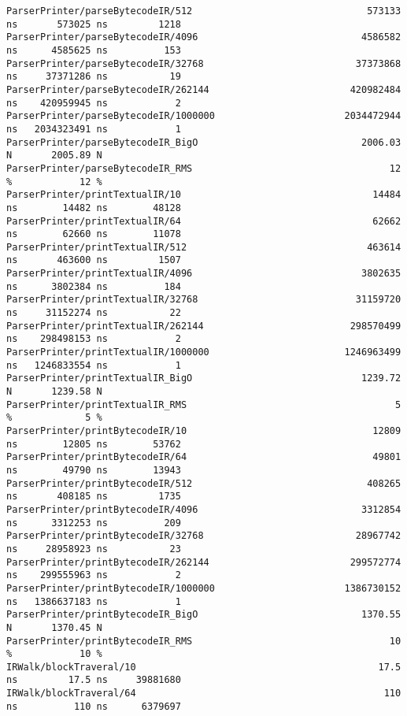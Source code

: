 \begin{code}
\begin{verbatim}
ParserPrinter/parseBytecodeIR/512                               573133 ns       573025 ns         1218
ParserPrinter/parseBytecodeIR/4096                             4586582 ns      4585625 ns          153
ParserPrinter/parseBytecodeIR/32768                           37373868 ns     37371286 ns           19
ParserPrinter/parseBytecodeIR/262144                         420982484 ns    420959945 ns            2
ParserPrinter/parseBytecodeIR/1000000                       2034472944 ns   2034323491 ns            1
ParserPrinter/parseBytecodeIR_BigO                             2006.03 N       2005.89 N
ParserPrinter/parseBytecodeIR_RMS                                   12 %            12 %
ParserPrinter/printTextualIR/10                                  14484 ns        14482 ns        48128
ParserPrinter/printTextualIR/64                                  62662 ns        62660 ns        11078
ParserPrinter/printTextualIR/512                                463614 ns       463600 ns         1507
ParserPrinter/printTextualIR/4096                              3802635 ns      3802384 ns          184
ParserPrinter/printTextualIR/32768                            31159720 ns     31152274 ns           22
ParserPrinter/printTextualIR/262144                          298570499 ns    298498153 ns            2
ParserPrinter/printTextualIR/1000000                        1246963499 ns   1246833554 ns            1
ParserPrinter/printTextualIR_BigO                              1239.72 N       1239.58 N
ParserPrinter/printTextualIR_RMS                                     5 %             5 %
ParserPrinter/printBytecodeIR/10                                 12809 ns        12805 ns        53762
ParserPrinter/printBytecodeIR/64                                 49801 ns        49790 ns        13943
ParserPrinter/printBytecodeIR/512                               408265 ns       408185 ns         1735
ParserPrinter/printBytecodeIR/4096                             3312854 ns      3312253 ns          209
ParserPrinter/printBytecodeIR/32768                           28967742 ns     28958923 ns           23
ParserPrinter/printBytecodeIR/262144                         299572774 ns    299555963 ns            2
ParserPrinter/printBytecodeIR/1000000                       1386730152 ns   1386637183 ns            1
ParserPrinter/printBytecodeIR_BigO                             1370.55 N       1370.45 N
ParserPrinter/printBytecodeIR_RMS                                   10 %            10 %
IRWalk/blockTraveral/10                                           17.5 ns         17.5 ns     39881680
IRWalk/blockTraveral/64                                            110 ns          110 ns      6379697

\end{verbatim}
\end{code}
